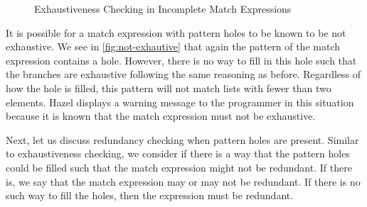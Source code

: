 \begin{figure}[h]
  \centering
\hfill
  \caption{Exhaustiveness Checking in Incomplete Match Expressions}
  \label{fig:exhaustiveness}
\end{figure}

It is possible for a match expression with pattern holes to be known to be not exhaustive. 
We see in \autoref{fig:not-exhautive} that again the pattern of the match expression contains a hole. 
However, there is no way to fill in this hole such that the branches are exhaustive following the same reasoning as before. Regardless of how the hole is filled, this pattern will not match lists with fewer than two elements. 
Hazel displays a warning message to the programmer in this situation because it is known that the match expression must not be exhaustive.

Next, let us discuss redundancy checking when pattern holes are present. 
Similar to exhaustiveness checking, we consider if there is a way that the pattern holes could be filled such that the match expression might not be redundant. 
If there is, we say that the match expression may or may not be redundant. 
If there is no such way to fill the holes, then the expression must be redundant.

